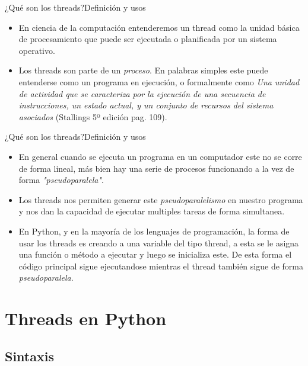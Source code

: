 \documentclass[spanish]{beamer}
\begin{document}
\begin{frame}{¿Qué son los threads?}{Definición y usos}
  \begin{itemize}
  \item
    En ciencia de la computación entenderemos un \alert{thread} como la unidad básica de procesamiento que puede ser ejecutada o planificada por un sistema operativo.
  \item
    Los threads son parte de un \textit{proceso}. En palabras simples este puede entenderse como un programa en ejecución, o formalmente como \textit{Una unidad de actividad que se caracteriza por la ejecución de una secuencia de instrucciones, un estado actual, y un conjunto de recursos del sistema asociados }(Stallings 5º edición pag. 109).
  \end{itemize}
\end{frame}

\begin{frame}{¿Qué son los threads?}{Definición y usos}
  \begin{itemize}
  \item
    En general cuando se ejecuta un programa en un computador este no se corre de forma lineal, más bien hay una serie de procesos funcionando a la vez de forma \textit{"pseudoparalela"}.
  \item
    Los \alert{threads} nos permiten generar este \textit{pseudoparalelismo} en nuestro programa y nos dan la capacidad de ejecutar multiples tareas de forma simultanea.
  \item
    En \alert{Python}, y en la mayoría de los lenguajes de programación, la forma de usar los \alert{threads} es creando a una variable del tipo \alert{thread}, a esta se le asigna una función o método a ejecutar y luego se inicializa este. De esta forma el código principal sigue ejecutandose mientras el \alert{thread} también sigue de forma \textit{pseudoparalela}.
  \end{itemize}
\end{frame}




\section{Threads en Python}

\subsection{Sintaxis}
\end{document}
